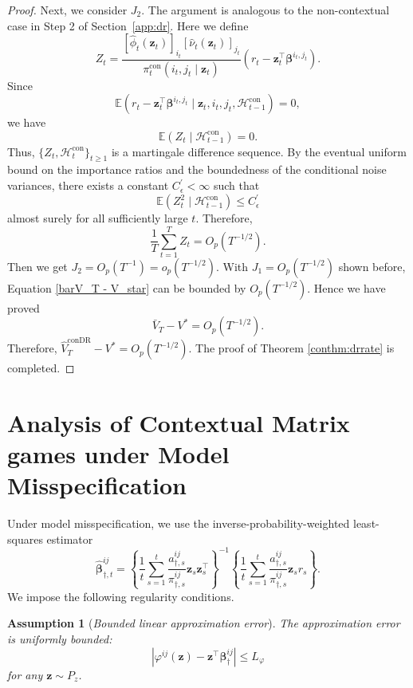 \documentclass[12pt]{article}
\newtheorem{assumption}{Assumption}[section]
\begin{document}
\begin{proof}
Next, we consider $J_2$. The argument is analogous to the non-contextual case in Step 2 of Section~\ref{app:dr}. Here we define
\[
Z_t = \frac{
[\widehat{\phi}_t(\bm z_t)]_{i_t}
[\widehat{\nu}_t(\bm z_t)]_{j_t}
}{
\pi_t^\mathrm{con}(i_t,j_t\mid\bm z_t)
}
\left(
r_t-\bm z_t^\top\bm\beta^{i_t,j_t}
\right).
\]
Since
\[
\mathbb E\left(
r_t-\bm z_t^\top\bm\beta^{i_t,j_t}
\mid
\bm z_t,i_t,j_t,\mathcal H_{t-1}^{\mathrm{con}}
\right)
=
0,
\]
we have
\[
\mathbb E\left(
Z_t
\mid
\mathcal H_{t-1}^{\mathrm{con}}
\right)
=
0.
\]
Thus, $\{Z_t,\mathcal H_t^{\mathrm{con}}\}_{t\ge1}$ is a martingale
difference sequence. By the eventual uniform bound on the importance ratios and
the boundedness of the conditional noise variances, there exists a constant
$C_\epsilon^\prime<\infty$ such that
\[
\mathbb E\left(
Z_t^2
\mid
\mathcal H_{t-1}^{\mathrm{con}}
\right)
\le C_\epsilon^\prime
\]
almost surely for all sufficiently large $t$. Therefore,
\[
\frac{1}{T}
\sum_{t=1}^T Z_t
=
O_p(T^{-1/2}).
\]
Then we get $J_2 = O_p(T^{-1}) = o_p(T^{-1/2})$. With $J_1=O_p(T^{-1/2})$ shown before, Equation \eqref{barV_T - V_star} can be bounded by $O_p(T^{-1/2})$. Hence we have proved
\[
\bar{V}_T - V^\ast= O_p(T^{-1/2}).
\]
Therefore, $\widehat{V}_T^\text{conDR} - V^\ast = O_p(T^{-1/2})$. The proof of Theorem \ref{conthm:drrate} is completed.
\end{proof}

\section{Analysis of Contextual Matrix games under Model Misspecification}
\label{app:sec:mis_model}
Under model misspecification, we use the inverse-probability-weighted least-squares estimator
\begin{equation}
\label{equ:wls_context_misspecified}
\widehat{\bm\beta}_{\dagger,t}^{ij}
=
\left\{
\frac{1}{t}
\sum_{s=1}^t
\frac{
a_{\dagger,s}^{ij}
}{
\pi_{\dagger,s}^{ij}
}
\bm z_s\bm z_s^\top
\right\}^{-1}
\left\{
\frac{1}{t}
\sum_{s=1}^t
\frac{
a_{\dagger,s}^{ij}
}{
\pi_{\dagger,s}^{ij}
}
\bm z_sr_s
\right\}.
\end{equation}
We impose the following regularity conditions.

\begin{assumption}[\emph{Bounded linear approximation error}]
\label{ass:context_misspecified}
The approximation error is uniformly bounded:
\[
\left|
\varphi^{ij}(\bm z) - \bm z^\top\bm\beta_\dagger^{ij}
\right|
\le
L_\varphi
\]
for any $\bm z \sim P_z$.
\end{assumption}
\end{document}
